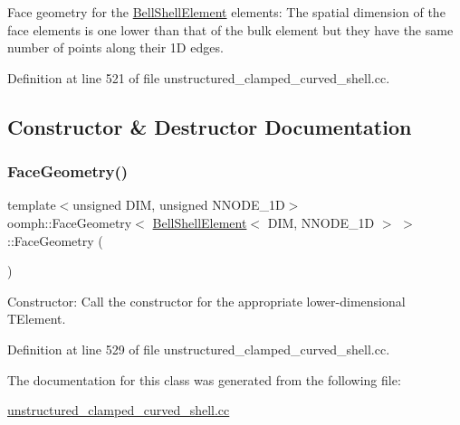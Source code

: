 Face geometry for the \hyperlink{classoomph_1_1BellShellElement}{Bell\+Shell\+Element} elements\+: The spatial dimension of the face elements is one lower than that of the bulk element but they have the same number of points along their 1D edges. 

Definition at line 521 of file unstructured\+\_\+clamped\+\_\+curved\+\_\+shell.\+cc.



\subsection{Constructor \& Destructor Documentation}
\mbox{\label{classoomph_1_1FaceGeometry_3_01BellShellElement_3_01DIM_00_01NNODE__1D_01_4_01_4_ae3b9e81d2729d8b818c563812e8cf8f9}} 
\subsubsection{\texorpdfstring{Face\+Geometry()}{FaceGeometry()}}
{\footnotesize\ttfamily template$<$unsigned D\+IM, unsigned N\+N\+O\+D\+E\+\_\+1D$>$ \\
oomph\+::\+Face\+Geometry$<$ \hyperlink{classoomph_1_1BellShellElement}{Bell\+Shell\+Element}$<$ D\+IM, N\+N\+O\+D\+E\+\_\+1D $>$ $>$\+::Face\+Geometry (\begin{DoxyParamCaption}{ }\end{DoxyParamCaption})\hspace{0.3cm}{\ttfamily [inline]}}



Constructor\+: Call the constructor for the appropriate lower-\/dimensional T\+Element. 



Definition at line 529 of file unstructured\+\_\+clamped\+\_\+curved\+\_\+shell.\+cc.



The documentation for this class was generated from the following file\+:\begin{DoxyCompactItemize}
\item 
\hyperlink{unstructured__clamped__curved__shell_8cc}{unstructured\+\_\+clamped\+\_\+curved\+\_\+shell.\+cc}\end{DoxyCompactItemize}
